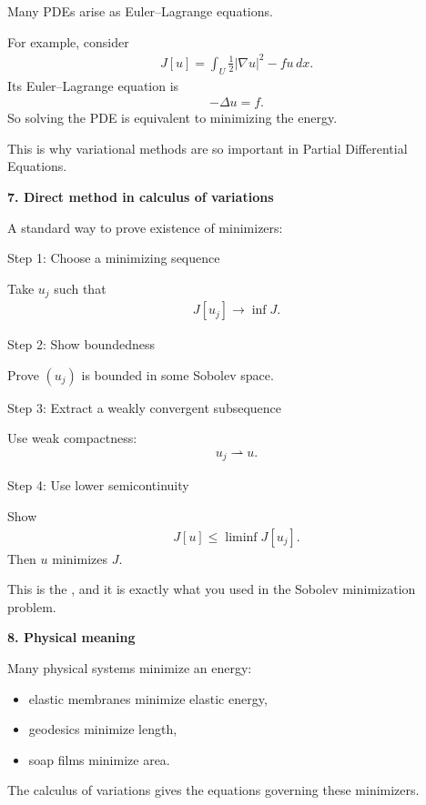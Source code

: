 \documentclass[12pt,a4paper]{report}
\begin{document}
\begin{description}
Many PDEs arise as Euler–Lagrange equations.

For example, consider
\begin{align*}
J[u]=\int_U \frac12 |\nabla u|^2-fu\,dx.
\end{align*}
Its Euler–Lagrange equation is
\begin{align*}
-\Delta u=f.
\end{align*}
So solving the PDE is equivalent to minimizing the energy.

This is why variational methods are so important in Partial Differential Equations.

\item \textbf{7. Direct method in calculus of variations}

A standard way to prove existence of minimizers:

	\begin{description}
    \item Step 1: Choose a minimizing sequence

Take $u_j$ such that
\begin{align*}
J[u_j]\to \inf J.
\end{align*}

    \item Step 2: Show boundedness

Prove $(u_j)$ is bounded in some Sobolev space.

    \item Step 3: Extract a weakly convergent subsequence

Use weak compactness:
\begin{align*}
u_j\rightharpoonup u.
\end{align*}

    \item Step 4: Use lower semicontinuity

Show
\begin{align*}
J[u]\le \liminf J[u_j].
\end{align*}
Then $u$ minimizes $J$.
	\end{description}

This is the , and it is exactly what you used in the Sobolev minimization problem.

\item \textbf{8. Physical meaning}

Many physical systems minimize an energy:
	\begin{itemize}
    \item elastic membranes minimize elastic energy,
    \item geodesics minimize length,
    \item soap films minimize area.
	\end{itemize}
The calculus of variations gives the equations governing these minimizers.


\end{description}
\end{document}
